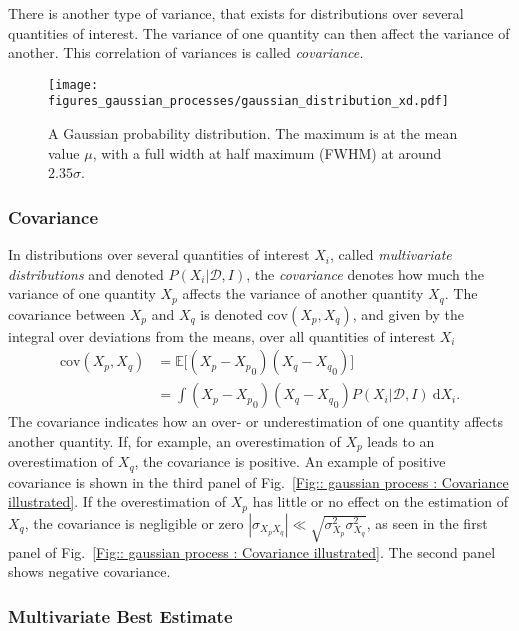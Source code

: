 \documentclass[twoside,english]{uiofysmaster}
\begin{document}
{{There is another type of variance, that exists for distributions over several quantities of interest. The variance of one quantity can then affect the variance of another. This correlation of variances is called \textit{covariance.}



\begin{figure}
\centering
\texttt{[image: figures\_gaussian\_processes/gaussian\_distribution\_xd.pdf]}
\caption{A Gaussian probability distribution. The maximum is at the mean value $\mu$, with a full width at half maximum (FWHM) at around $2.35 \sigma$. }
\label{Fig:: gaussian process : Gaussian distribution}
\end{figure}

\subsubsection{Covariance}\label{Sec:: gaussian process : Covariance}

In distributions over several quantities of interest $X_i$, called \textit{multivariate distributions} and denoted $P(X_i| \mathcal{D}, I)$, the \textit{covariance} denotes how much the variance of one quantity $X_p$ affects the variance of another quantity $X_q$. The covariance between $X_p$ and $X_q$ is denoted $\mathrm{cov}(X_p, X_q)$, and given by the integral over deviations from the means, over all quantities of interest $X_i$ 
\begin{align}\label{Eq:: gaussian process : Covariance definition}
\mathrm{cov}(X_p, X_q) &= \mathbb{E} \big[(X_p - {X_p}_0) (X_q - {X_q}_0) \big] \nonumber \\&=\int (X_p - {X_p}_0) (X_q - {X_q}_0) P (X_i | \mathcal{D}, I) ~\text{d}X_i.
\end{align}
The covariance indicates how an over- or underestimation of one quantity affects another quantity. If, for example, an overestimation of $X_p$ leads to an overestimation of $X_q$, the covariance is positive. An example of positive covariance is shown in the third panel of Fig.~\ref{Fig:: gaussian process : Covariance illustrated}. If the overestimation of $X_p$ has little or no effect on the estimation of $X_q$, the covariance is negligible or zero $|\sigma_{X_pX_q}| \ll \sqrt{\sigma_{X_p}^2 \sigma_{X_q}^2}$, as seen in the first panel of Fig.~\ref{Fig:: gaussian process : Covariance illustrated}. The second panel shows negative covariance.

\subsubsection{Multivariate Best Estimate}

}}
\end{document}
